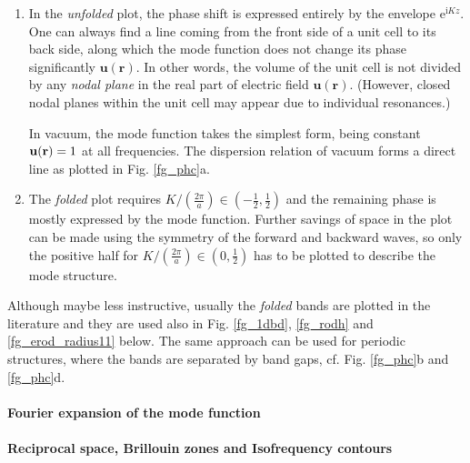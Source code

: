 \begin{enumerate}
 \item{In the \textit{unfolded} plot, the phase shift is expressed entirely by the envelope $\mathrm{e}^{\mathrm{i}Kz}$. One can always find a line coming from the front side of a unit cell to its back side, along which the mode function does not change its phase significantly $\mathbf{u(\mathbf{r})}$. In other words, the volume of the unit cell is not divided by any \textit{nodal plane} in the real part of electric field  $\mathbf{u(\mathbf{r})}$. (However, closed nodal planes within the unit cell may appear due to individual resonances.)

In vacuum, the mode function takes the simplest form, being constant $\mathbf{u({\mathbf{r}})} = 1$ at all frequencies. The dispersion relation of vacuum forms a direct line as plotted in Fig. \ref{fg_phc}a.} 
 \item{The \textit{folded} plot requires $K/\left(\frac{2\pi}{a}\right) \in (-\frac{1}{2}, \frac{1}{2})$ and the remaining phase is mostly expressed by the mode function. 
Further savings of space in the plot can be made using the symmetry of the forward and backward waves, so only the positive half for $K/\left(\frac{2\pi}{a}\right) \in (0, \frac{1}{2})$ has to be plotted to describe the mode structure.} 
\end{enumerate}
Although maybe less instructive, usually the \textit{folded} bands are plotted in the literature and they are used also in Fig. \ref{fg_1dbd}, \ref{fg_rodh} and \ref{fg_erod_radius11} below. The same approach can be used for periodic structures, where the bands are separated by band gaps, cf. Fig. \ref{fg_phc}b and \ref{fg_phc}d.

\paragraph{Fourier expansion of the mode function}%

\paragraph{Reciprocal space, Brillouin zones and Isofrequency contours} %

